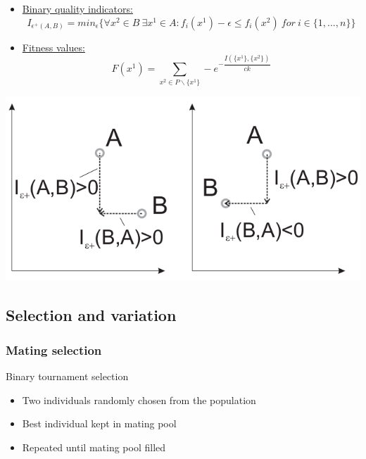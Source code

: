 \documentclass{beamer}
\begin{document}
\begin{frame}
\begin{adjustwidth}{-2.2em}{-2.2em}
\begin{itemize}
\item \underline{Binary quality indicators:}
\begin{equation}
I_{\epsilon^+ (A,B)} = min_{\epsilon} \{\forall x^2 \in B\ \exists x^1 \in A : f_i(x^1) - \epsilon \leq f_i (x^2)\ for\ i \in \{1,...,n\}\}
\end{equation}
\item \underline{Fitness values:}
\begin{equation}
F(x^1) = \sum_{x^2 \in P \backslash \{x^1\}} -e^{-\dfrac{I(\{x^1\},\{x^2\})}{ck}}
\end{equation}
\end{itemize}
\end{adjustwidth}
\begin{center}
\includegraphics[scale=0.2]{binaryIndicators.png} \footnotemark
\end{center}
\end{frame}

\subsection{Selection and variation}

\begin{frame}
\frametitle{Mating selection}
Binary tournament selection
\begin{itemize}
    \item Two individuals randomly chosen from the population
    \item Best individual kept in mating pool
    \item Repeated until mating pool filled
\end{itemize}
\end{frame}
\end{document}
